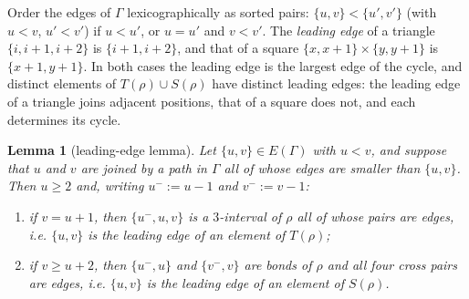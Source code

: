 \documentclass[11pt,reqno]{amsart}
\theoremstyle{plain}
\newtheorem{lemma}[lemma]{Lemma}
\theoremstyle{definition}
\theoremstyle{remark}
\newcommand{\Gam}{\Gamma}
\begin{document}
Order the edges of $\Gam$ lexicographically as sorted pairs: $\{u,v\}<\{u',v'\}$ (with $u<v$, $u'<v'$) if $u<u'$, or $u=u'$ and $v<v'$. The \emph{leading edge} of a triangle $\{i,i+1,i+2\}$ is $\{i+1,i+2\}$, and that of a square $\{x,x+1\}\times\{y,y+1\}$ is $\{x+1,y+1\}$. In both cases the leading edge is the largest edge of the cycle, and distinct elements of $T(\rho)\cup S(\rho)$ have distinct leading edges: the leading edge of a triangle joins adjacent positions, that of a square does not, and each determines its cycle.

\begin{lemma}[leading-edge lemma]\label{lem:leading}
Let $\{u,v\}\in E(\Gam)$ with $u<v$, and suppose that $u$ and $v$ are joined by a path in $\Gam$ all of whose edges are smaller than $\{u,v\}$. Then $u\ge2$ and, writing $u^-:=u-1$ and $v^-:=v-1$:
\begin{enumerate}
\item[$(\alpha)$] if $v=u+1$, then $\{u^-,u,v\}$ is a $3$-interval of $\rho$ all of whose pairs are edges, i.e. $\{u,v\}$ is the leading edge of an element of $T(\rho)$;
\item[$(\beta)$] if $v\ge u+2$, then $\{u^-,u\}$ and $\{v^-,v\}$ are bonds of $\rho$ and all four cross pairs are edges, i.e. $\{u,v\}$ is the leading edge of an element of $S(\rho)$.
\end{enumerate}
\end{lemma}
\end{document}
